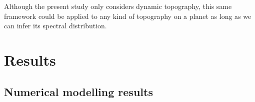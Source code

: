 \documentclass[trackchanges]{aastex63}
\newcommand{\todo}[1]{\textit{\textcolor{violet}{{#1}}}}
\begin{document}





Although the present study only considers dynamic topography, this same framework could be applied to any kind of topography on a planet as long as we can infer its spectral distribution.




\section{Results} \label{sec:results}


\subsection{Numerical modelling results}


\end{document}
